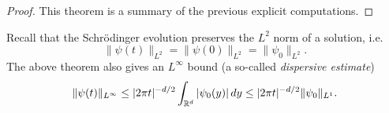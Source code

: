 \begin{proof}
  This theorem is a summary of the previous
  explicit computations.
\end{proof}

\begin{remark}
  Recall that the Schr\"odinger evolution
  preserves the $L^2$ norm of a solution, i.e.
  \[
    \|\psi(t)\|_{L^2} = \|\psi(0)\|_{L^2} = \|\psi_0\|_{L^2}.
  \]
  The above theorem also gives an $L^\infty$ bound
  (a so-called \emph{dispersive estimate})
  \[
    \|\psi(t)\|_{L^\infty}
    \le |2\pi t|^{-d / 2} \int_{\mathbb{R}^d} |\psi_0(y)|\, dy
    \le |2\pi t|^{-d / 2} \|\psi_0\|_{L^1}.
  \]
\end{remark}
